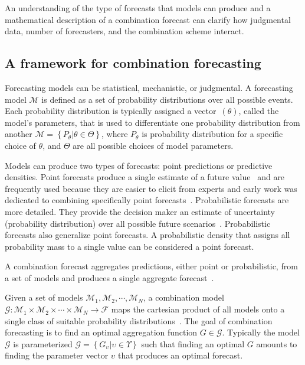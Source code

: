 \documentclass[preprint]{elsarticle}
\def\l{\left}
\def\r{\right}
\begin{document}
An understanding of the type of forecasts that models can produce and a mathematical description of a combination forecast can clarify how judgmental data, number of forecasters, and the combination scheme interact.

\subsection{A framework for combination forecasting}

Forecasting models can be statistical, mechanistic, or judgmental. 
A forecasting model $\mathcal{M}$ is defined as a set of probability distributions over all possible events.
Each probability distribution is typically assigned a vector~$(\theta)$, called the model's parameters, that is used to differentiate one probability distribution from another
$\mathcal{M} = \l\{ P_{\theta} | \theta \in \Theta \r\}$,
where $P_{\theta}$ is probability distribution for a specific choice of $\theta$, and $\Theta$ are all possible choices of model parameters.

Models can produce two types of forecasts: point predictions or predictive densities. 
Point forecasts produce a single estimate of a future value~\cite{bates1969combination,granger1984improved} and are frequently used because they are easier to elicit from experts and early work was dedicated to combining specifically point forecasts~\cite{granger1984improved,bates1969combination,galton1907vox}.
Probabilistic forecasts are more detailed. 
They provide the decision maker an estimate of uncertainty (probability distribution) over all possible future scenarios~\cite{clemen1999combining,stone1961opinion,winkler1981combining,genest1986combining,winkler1968consensus,dawid1995coherent,ranjan2010combining,gneiting2013combining,hora2015calibration}.
Probabilistic forecasts also generalize point forecasts.
A probabilistic density that assigns all probability mass to a single value can be considered a point forecast.

A combination forecast aggregates predictions, either point or probabilistic, from a set of models and produces a single aggregate forecast~\cite{clemen1999combining,winkler1981combining,genest1986combining}.

Given a set of models $\mathcal{M}_{1},\mathcal{M}_{2},\cdots,\mathcal{M}_{N}$, a combination model $\mathcal{G}:\mathcal{M}_{1} \times \mathcal{M}_{2} \times \cdots \times \mathcal{M}_{N} \to \mathcal{F}$ maps the cartesian product of all models onto a single class of suitable probability distributions~\cite{gneiting2013combining}.
The goal of combination forecasting is to find an optimal aggregation function $G \in \mathcal{G}$.
Typically the model $\mathcal{G}$ is parameterized $\mathcal{G} = \l\{ G_{\upsilon} | \upsilon \in \Upsilon \r\} $ such that finding an optimal $G$ amounts to finding the parameter vector $\upsilon$ that produces an optimal forecast.
\end{document}
